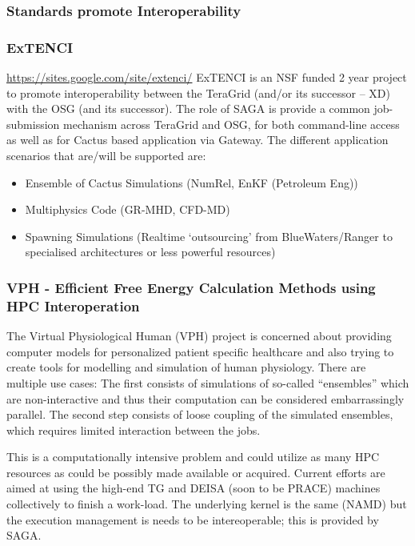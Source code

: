 \documentclass[12pt]{article}
\begin{document}
 \subsubsection{Standards promote Interoperability}

 \subsubsection*{ExTENCI}
 \url{https://sites.google.com/site/extenci/} ExTENCI is an NSF funded
 2 year project to promote interoperability between the TeraGrid
 (and/or its successor -- XD) with the OSG (and its successor).
 The role of SAGA is provide a common job-submission mechanism
 across TeraGrid and OSG, for both command-line access as well
 as for Cactus based application via Gateway.
 The different application scenarios that are/will be supported are:
 \begin{itemize}
 \item Ensemble of Cactus Simulations (NumRel, EnKF (Petroleum Eng))
 \item Multiphysics Code (GR-MHD, CFD-MD)
 \item Spawning Simulations (Realtime ‘outsourcing’ from
   BlueWaters/Ranger to specialised architectures or less powerful
   resources)
 \end{itemize}


\subsubsection*{VPH - Efficient Free Energy Calculation Methods using
  HPC Interoperation}

The Virtual Physiological Human (VPH) project is concerned about
providing computer models for personalized patient specific healthcare
and also trying to create tools for modelling and simulation of human
physiology. There are multiple use cases: The first consists of
simulations of so-called “ensembles” which are non-interactive and
thus their computation can be considered embarrassingly parallel. The
second step consists of loose coupling of the simulated ensembles,
which requires limited interaction between the jobs.

This is a computationally intensive problem and could utilize as many
HPC resources as could be possibly made available or acquired. Current
efforts are aimed at using the high-end TG and DEISA (soon to be
PRACE) machines collectively to finish a work-load. The underlying
kernel is the same (NAMD) but the execution management is needs
to be intereoperable; this is provided by SAGA.
\end{document}
